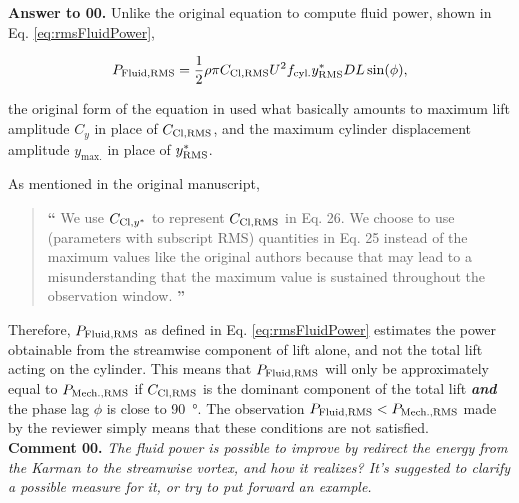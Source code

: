 \documentclass[12pt]{article}
\newcounter{question}
\newcommand{\name}{00}
\newcommand{\question}[1]{\refstepcounter{question} \noindent \textbf{Comment \name.\thequestion}\vskip 0.25cm \noindent \emph{#1}\\}
\newcommand{\answer}[1]{\noindent \textbf{Answer to \name.\thequestion}\vskip 0.25cm \noindent #1 \mbox{}\\}
\begin{document}
\answer{
  Unlike the original equation to compute fluid power, shown in Eq. \ref{eq:rmsFluidPower},

  \begin{equation}
    P_{\text{Fluid,RMS}} = \frac{1}{2} \rho \pi C_{\text{Cl},\text{RMS}} U^{2} f_{\text{cyl.}} y^{*}_{\text{RMS}} D L \sin(\phi),
    \label{eq:rmsFluidPower}
  \end{equation}

  \noindent the original form of the equation in \citet{Raghavan2007} used what basically amounts to maximum lift amplitude $C_{y}$ in place of $C_{\text{Cl},\text{RMS}}$, and the maximum cylinder displacement amplitude $y_{\text{max.}}$ in place of $y^{*}_{\text{RMS}}$.

  As mentioned in the original manuscript,

  \begin{quotation}
    \hspace*{-1.3cm} {\Large \textbf{``}} We use $C_{\text{Cl},y^{*}}$ to represent $C_{\text{Cl},\text{RMS}}$ in Eq. 26. We choose to use \rms{} (parameters with subscript RMS) quantities in Eq. 25 instead of the maximum values like the original authors because that may lead to a misunderstanding that the maximum value is sustained throughout the observation window. {\Large \textbf{''}}
  \end{quotation}

  \noindent Therefore, $P_{\text{Fluid,RMS}}$ as defined in Eq. \ref{eq:rmsFluidPower} estimates the \rms{} power obtainable from the streamwise component of lift alone, and not the total lift acting on the cylinder. This means that $P_{\text{Fluid,RMS}}$ will only be approximately equal to $P_{\text{Mech.,RMS}}$ if $C_{\text{Cl},\text{RMS}}$ is the dominant component of the total lift \textbf{\textit{and}} the phase lag $\phi$ is close to \SI{90}{\degree}. The observation $P_{\text{Fluid,RMS}} < P_{\text{Mech.,RMS}}$ made by the reviewer simply means that these conditions are not satisfied.
}

\question{The fluid power is possible to improve by redirect the energy from the Karman to the streamwise vortex, and how it realizes? It's suggested to clarify a possible measure for it, or try to put forward an example.}
\end{document}
